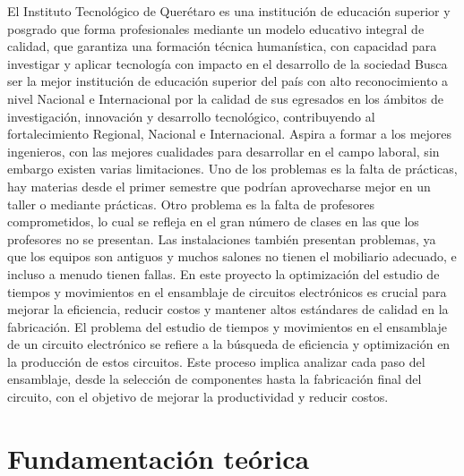     El Instituto Tecnológico de Querétaro es una institución de educación superior y posgrado que forma profesionales mediante un modelo educativo integral de calidad, que garantiza una formación técnica humanística, con capacidad para investigar y aplicar tecnología con impacto en el desarrollo de la sociedad
    Busca ser la mejor institución de educación superior del país con alto reconocimiento a nivel Nacional e Internacional por la calidad de sus egresados en los ámbitos de investigación, innovación y desarrollo tecnológico, contribuyendo al fortalecimiento Regional, Nacional e Internacional. \cite{TecNmCampusQuerétaro}
    Aspira a formar a los mejores ingenieros, con las mejores cualidades para desarrollar en el campo laboral, sin embargo existen varias limitaciones. Uno de los problemas es la falta de prácticas, hay materias desde el primer semestre que podrían aprovecharse mejor en un taller o mediante prácticas. Otro problema es la falta de profesores comprometidos, lo cual se refleja en el gran número de clases en las que los profesores no se presentan. Las instalaciones también presentan problemas, ya que los equipos son antiguos y muchos salones no tienen el mobiliario adecuado, e incluso a menudo tienen fallas.
    En este proyecto la optimización del estudio de tiempos y movimientos en el ensamblaje de circuitos electrónicos es crucial para mejorar la eficiencia, reducir costos y mantener altos estándares de calidad en la fabricación. El problema del estudio de tiempos y movimientos en el ensamblaje de un circuito electrónico se refiere a la búsqueda de eficiencia y optimización en la producción de estos circuitos. Este proceso implica analizar cada paso del ensamblaje, desde la selección de componentes hasta la fabricación final del circuito, con el objetivo de mejorar la productividad y reducir costos.\cite{CircuitosEléctricosyElectrónicos}
    \section{Fundamentación teórica}
    
